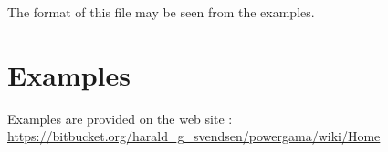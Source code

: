 \documentclass{article}
\begin{document}
The format of this file may be seen from the examples.


\section{Examples}

Examples are provided on the web site \cite{powergamauserguide}:\\
\url{https://bitbucket.org/harald_g_svendsen/powergama/wiki/Home}






%
%

\end{document}
